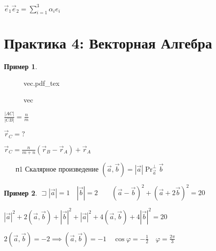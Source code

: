 \documentclass{book}
\theoremstyle{definition}
\newtheorem*{example}{Пример}
\newcommand{\incfig}[1]{%
    \def\svgwidth{\columnwidth}
    {#1.pdf_tex}
}
\begin{document}
$\vec e_1\vec e_2 = \sum\limits_{i=1}^{3} \alpha_ie_i$

\section{Практика 4: Векторная Алгебра}
    \begin{example}
\begin{figure}[ht]
    \centering
    \incfig{vec}
    \caption{vec}
    \label{fig:vec}
\end{figure}
$\frac{\left| AC \right| }{\left| CB \right| } = \frac{n}{m}$ 

$\vec r_C = ?$

$\vec r_C = \frac{n}{m+n} \left( \vec r_B - \vec r_A \right)  + \vec r_A$
    \end{example}

    \begin{itemize}
        \item [п1] Скалярное произведение $(\vec a, \vec b) = \left| \vec a \right| \Pr_{\vec a}^{\perp}\vec b$
    \end{itemize}

    \begin{example}
        $\sqsupset \left| \vec a \right|  = 1\quad \left| \vec b \right|  = 2\qquad (\vec a - \vec b)^2 + (\vec a + 2\vec b)^2=20$

        $\left| \vec  a\right|^2 + 2(\vec a, \vec b) + \left| \vec b \right|^2 + \left| \vec a \right| ^2 + 4(\vec a, \vec b) + 4\left| \vec b \right| ^2 = 20  $

        $2(\vec a, \vec b) = -2 \implies (\vec a, \vec b) = -1\quad \cos  \varphi = -\frac{1}{2}\quad \varphi = \frac{2\pi }{3}$
    \end{example}
\end{document}
